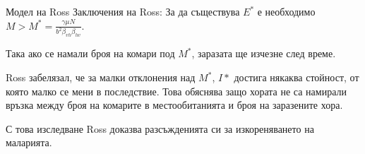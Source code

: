 \begin{frame}[t]{Модел на Ross}
  Заключения на Ross:
  За да съществува $E^*$ е необходимо $M > M^* = \frac{\gamma \mu N}{b^2 \beta_{vh} \beta_{hv}}$.

  Така ако се намали броя на комари под $M^*$, заразата ще изчезне след време.

  Ross забелязал, че за малки отклонения над $M^*$, $I*$ достига някаква стойност, от която малко се мени в последствие.
  Това обяснява защо хората не са намирали връзка между броя на комарите в местообитанията и броя на заразените хора.

  С това изследване Ross доказва разсъжденията си за изкореняването на маларията.
\end{frame}
